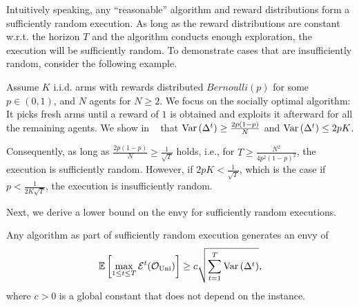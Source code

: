 Intuitively speaking, any ``reasonable'' algorithm and reward distributions form a sufficiently random execution. As long as the reward distributions are constant w.r.t. the horizon $T$ and the algorithm conducts enough exploration, the execution will be sufficiently random. To demonstrate cases that are insufficiently random, consider the following example.
\begin{example}\label{example: ber suff}
Assume $K$ i.i.d. arms with rewards distributed $Bernoulli(p)$ for some $p \in (0,1)$, and $N$ agents for $N\geq 2$. We focus on the socially optimal algorithm: It picks fresh arms until a reward of $1$ is obtained and exploits it afterward for all the remaining agents. We show in \ifnum{}\fi~ that $\mathrm{Var}\left( \Delta^t \right) \geq \frac{2p(1 - p)}{N}$ and $\mathrm{Var}\left( \Delta^t \right) \leq  2pK$. 


Consequently, as long as  $\frac{2p(1 - p)}{N} \geq \frac{1}{\sqrt T}$ holds, i.e., for $T \geq \frac{N^2}{4p^2(1-p)^2}$, the execution is sufficiently random. However, if $2pK <\frac{1}{\sqrt T}$, which is the case if $p<\frac{1}{2K\sqrt T}$, the execution is insufficiently random.
\end{example}
Next, we derive a lower bound on the envy for sufficiently random executions.
\begin{theorem}\label{thm: uni lower-bound}
Any algorithm as part of sufficiently random execution generates an envy of
\[\mathbb{E}\left[ \max_{1\leq t \leq T} \mathcal{E}^t  (\mathcal O_{\textnormal{Uni}}) \right] \geq c\sqrt{ \sum^{T}_{t=1}{\mathrm{Var}\left( \Delta^t \right)}},\]
where $c>0$ is a global constant that does not depend on the instance. 
\end{theorem}


